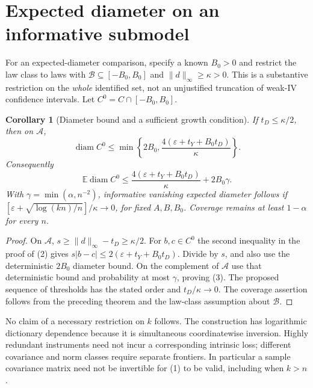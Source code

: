 \documentclass[11pt]{article}
\newtheorem{corollary}[theorem]{Corollary}
\theoremstyle{remark}
\newcommand{\E}{\mathbb E}
\newcommand{\diam}{\operatorname{diam}}
\begin{document}
\section{Expected diameter on an informative submodel}
For an expected-diameter comparison, specify a known $B_0>0$ and restrict
the law class to laws with $\mathcal B\subseteq[-B_0,B_0]$ and
$\|d\|_\infty\geq\kappa>0$. This is a substantive restriction on the
\emph{whole} identified set, not an unjustified truncation of weak-IV
confidence intervals. Let $C^0=C\cap[-B_0,B_0]$.

\begin{corollary}[Diameter bound and a sufficient growth condition]
If $t_D\leq\kappa/2$, then on $\mathcal A$,
\[
 \diam C^0\leq\min\left\{2B_0,
       \frac{4(\varepsilon+t_Y+B_0t_D)}\kappa\right\}.
\]
Consequently
\[
 \E\diam C^0\leq
 \frac{4(\varepsilon+t_Y+B_0t_D)}\kappa+2B_0\gamma. \tag{3}
\]
With $\gamma=\min(\alpha,n^{-2})$, informative vanishing expected
diameter follows if
$[\varepsilon+\sqrt{\log(kn)/n}]/\kappa\to0$, for fixed $A,B,B_0$.
Coverage remains at least $1-\alpha$ for every $n$.
\end{corollary}
\begin{proof}
On $\mathcal A$, $s\geq\|d\|_\infty-t_D\geq\kappa/2$.
For $b,c\in C^0$ the second inequality in the proof of (2) gives
$s|b-c|\leq2(\varepsilon+t_Y+B_0t_D)$. Divide by $s$, and also use
the deterministic $2B_0$ diameter bound. On the complement of
$\mathcal A$ use that deterministic bound and probability at most
$\gamma$, proving (3). The proposed sequence of thresholds has the stated
order and $t_D/\kappa\to0$. The coverage assertion follows from the
preceding theorem and the law-class assumption about $\mathcal B$.
\end{proof}

No claim of a necessary restriction on $k$ follows. The construction has
logarithmic dictionary dependence because it is simultaneous coordinatewise
inversion. Highly redundant instruments need not incur a corresponding
intrinsic loss; different covariance and norm classes require separate
frontiers. In particular a sample covariance matrix need not be invertible
for (1) to be valid, including when $k>n$.
\end{document}
